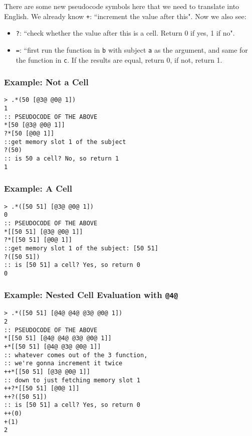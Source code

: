 \documentclass[twoside]{article}
\begin{document}
There are some new pseudocode symbols here that we need to translate into English. We already know \lstinline[style=inlinecode]{+}: ``increment the value after this". Now we also see:

\begin{itemize}
  \item  \lstinline[style=inlinecode]{?}: ``check whether the value after this is a cell. Return 0 if yes, 1 if no".
  \item  \lstinline[style=inlinecode]{=}: ``first run the function in \lstinline[style=inlinecode]{b} with subject \lstinline[style=inlinecode]{a} as the argument, and same for the function in \lstinline[style=inlinecode]{c}. If the results are equal, return 0, if not, return 1.
\end{itemize}


\subsubsection{Example:  Not a Cell}

\begin{lstlisting}[style=listingcode]
> .*(50 [@3@ @0@ 1])
1
:: PSEUDOCODE OF THE ABOVE
*[50 [@3@ @0@ 1]]
?*[50 [@0@ 1]]
::get memory slot 1 of the subject
?(50)
:: is 50 a cell? No, so return 1
1
\end{lstlisting}

\subsubsection{Example:  A Cell}

\begin{lstlisting}[style=listingcode]
> .*([50 51] [@3@ @0@ 1])
0
:: PSEUDOCODE OF THE ABOVE
*[[50 51] [@3@ @0@ 1]]
?*[[50 51] [@0@ 1]]
::get memory slot 1 of the subject: [50 51]
?([50 51])
:: is [50 51] a cell? Yes, so return 0
0
\end{lstlisting}

\subsubsection{Example:  Nested Cell Evaluation with \lstinline[style=inlinecode]{@4@}}

\begin{lstlisting}[style=listingcode]
> .*([50 51] [@4@ @4@ @3@ @0@ 1])
2
:: PSEUDOCODE OF THE ABOVE
*[[50 51] [@4@ @4@ @3@ @0@ 1]]
+*[[50 51] [@4@ @3@ @0@ 1]]
:: whatever comes out of the 3 function,
:: we're gonna increment it twice
++*[[50 51] [@3@ @0@ 1]]
:: down to just fetching memory slot 1
++?*[[50 51] [@0@ 1]]
++?([50 51])
:: is [50 51] a cell? Yes, so return 0
++(0)
+(1)
2
\end{lstlisting}
\end{document}
